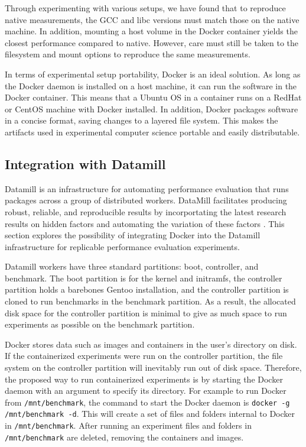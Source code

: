 \documentclass[11pt]{article}
\begin{document}
Through experimenting with various setups, we have found that to reproduce native measurements, the GCC and libc versions must match those on the native machine. In addition, mounting a host volume in the Docker container yields the closest performance compared to native. However, care must still be taken to the filesystem and mount options to reproduce the same measurements. 

In terms of experimental setup portability, Docker is an ideal solution. As long as the Docker daemon is installed on a host machine, it can run the software in the Docker container. This means that a Ubuntu OS in a container runs on a RedHat or CentOS machine with Docker installed. In addition, Docker packages software in a concise format, saving changes to a layered file system. This makes the artifacts used in experimental computer science portable and easily distributable. 

\subsection{Integration with Datamill}

Datamill is an infrastructure for automating performance evaluation that runs packages across a group of distributed workers. DataMill facilitates producing robust, reliable, and reproducible results by incorportating the latest research results on hidden factors and automating the variation of these factors \cite{augusto}. This section explores the possibility of integrating Docker into the Datamill infrastructure for replicable performance evaluation experiments. 

Datamill workers have three standard partitions: boot, controller, and benchmark. The boot partition is for the kernel and initramfs, the controller partition holds a barebones Gentoo installation, and the controller partition is cloned to run benchmarks in the benchmark partition. As a result, the allocated disk space for the controller partition is minimal to give as much space to run experiments as possible on the benchmark partition. 

Docker stores data such as images and containers in the user’s directory on disk. If the containerized experiments were run on the controller partition, the file system on the controller partition will inevitably run out of disk space. Therefore, the proposed way to run containerized experiments is by starting the Docker daemon with an argument to specify its directory. For example to run Docker from \texttt{/mnt/benchmark}, the command to start the Docker daemon is \texttt{docker -g /mnt/benchmark -d}. This will create a set of files and folders internal to Docker in \texttt{/mnt/benchmark}. After running an experiment files and folders in \texttt{/mnt/benchmark} are deleted, removing the containers and images. 
\end{document}
